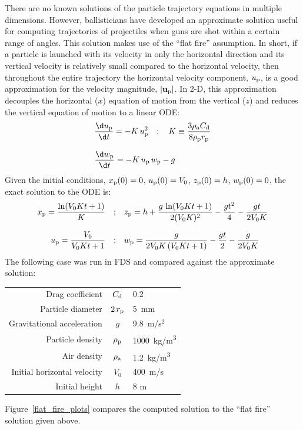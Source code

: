 \documentclass[11pt]{book}
\begin{document}
There are no known solutions of the particle trajectory equations in multiple dimensions. However, ballisticians have developed an approximate solution useful for computing trajectories of projectiles when guns are shot within a certain range of angles. This solution makes use of the ``flat fire'' assumption. In short, if a particle is launched with its velocity in only the horizontal direction and its vertical velocity is relatively small compared to the horizontal velocity, then throughout the entire trajectory the horizontal velocity component, $u_{\rm p}$, is a good approximation for the velocity magnitude, $|\mathbf{u_{\rm p}}|$. In 2-D, this approximation decouples the horizontal ($x$) equation of motion from the vertical ($z$) and reduces the vertical equation of motion to a linear ODE:
\begin{align}
   &\frac{\d u_{\rm p}}{\d t} = -K \, u_{\rm p}^2 \quad ;  \quad K \equiv \frac{3 \rho_{\rm a} C_{\rm d}}{8 \rho_{\rm p} r_{\rm p}} \\[.1in]
   &\frac{\d w_{\rm p}}{\d t} = -K \, u_{\rm p} \, w_{\rm p} - g
\end{align}
Given the initial conditions, $x_{\rm p}(0) = 0$, $u_{\rm p}(0) = V_0$, $z_{\rm p}(0) = h$, $w_{\rm p}(0) = 0$, the exact solution to the ODE is:
\begin{align}
    x_{\rm p} = \frac{\ln(V_0 K t + 1)}{K} \quad ;& \quad
    z_{\rm p} = h + \frac{g \, \ln(V_0 K t + 1)}{2 (V_0 K)^2} - \frac{g t^2}{4} - \frac{g t}{2 V_0 K} \\[.1in]
    u_{\rm p} = \frac{V_0}{V_0 K t + 1} \quad ;& \quad w_{\rm p} = \frac{g}{2 V_0 K \, (V_0 K t + 1)} - \frac{g t}{2} - \frac{g}{2 V_0 K}
\end{align}
The following case was run in FDS and compared against the approximate solution:
\begin{center}
\begin{tabular}{|r|c|l|}
\hline
Drag coefficient                  & $C_{\rm d}$          & 0.2 \\
Particle diameter                 & $2\, r_{\rm p}$      & 5~mm \\
Gravitational acceleration        & $g$                  & 9.8~m/s$^2$ \\
Particle density                  & $\rho_{\rm p}$       & 1000~\unit{kg/m^3} \\
Air density                       & $\rho_{\rm a}$       & 1.2~\unit{kg/m^3} \\
Initial horizontal velocity       & $V_0$                & 400~m/s \\
Initial height                    & $h$                  & 8 m \\
\hline
\end{tabular}
\end{center}
Figure~\ref{flat_fire_plots} compares the computed solution to the ``flat fire'' solution given above.
\end{document}
